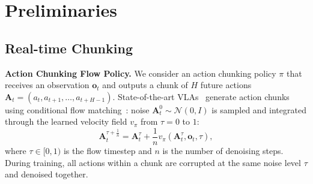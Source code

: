 \documentclass{article}
\begin{document}

\section{Preliminaries}
\label{sec:background}

\subsection{Real-time Chunking}
\label{sec:bg_rtc}

\textbf{Action Chunking Flow Policy.}
We consider an action chunking policy $\pi$ that receives an observation $\mathbf{o}_t$ and outputs a chunk of $H$ future actions $\mathbf{A}_t = (a_t, a_{t+1}, \ldots, a_{t+H-1})$.
State-of-the-art VLAs~\citep{black2024pi_0, intelligence2025pi_} generate action chunks using conditional flow matching~\citep{lipman2022flow, zhan2026mean}: noise $\mathbf{A}^0_t \sim \mathcal{N}(0, I)$ is sampled and integrated through the learned velocity field $v_\pi$ from $\tau=0$ to $1$:
\begin{equation}
    \mathbf{A}_t^{\tau+\frac{1}{n}} = \mathbf{A}_t^\tau + \frac{1}{n} v_\pi( \mathbf{A}_t^\tau, \mathbf{o}_t, \tau),
    \label{eq:flow_step}
\end{equation}
where $\tau \in [0, 1)$ is the flow timestep and $n$ is the number of denoising steps.
During training, all actions within a chunk are corrupted at the same noise level $\tau$ and denoised together.
\end{document}
